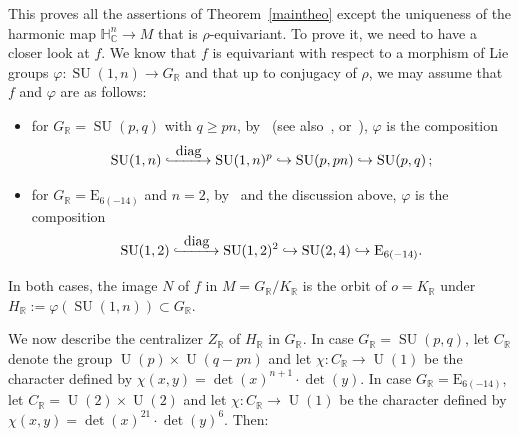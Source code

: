 \documentclass[10pt]{amsart}
\newcommand{\hto}{\mathrel{\lhook\joinrel\to}}
\newcommand{\To}[1]{\mathchoice{\xrightarrow{\textstyle\kern4pt#1\kern3pt}}{\stackrel{#1}{\longrightarrow}}{}{}}
\newcommand{\Hto}[1]{\mathrel{\lhook\joinrel\To{#1}}}
\newcommand{\citestar}[3]{\cite[#3]{#1}}
\theoremstyle{plain}
\theoremstyle{definition}
\DeclareMathOperator{\diag}{diag}
\DeclareMathOperator{\SU}{SU}
\DeclareMathOperator{\rU}{U}
\newcommand{\bR}{\mathbb{R}}
\newcommand{\HC}{{\mathbb{H}^n_\mathbb{C}}}
\begin{document}
This proves all the assertions of Theorem~\ref{maintheo}
except the uniqueness of the harmonic map $\HC\to M$ that is
$\rho$-equivariant. To prove
it, we need to have a closer look at $f$. We know that
$f$ is equivariant with respect to a morphism of
Lie groups $\varphi: \SU(1,n) \to G_\bR$ and that up to conjugacy of $\rho$, we may assume that $f$
and $\varphi$ are as follows:
\begin{itemize}
\item for $G_\bR=\SU(p,q)$ with $q\geq pn$, by~\citestar{KMrank2}*{} (see
also~\citestar{KM}*{Prop.\,4.10}, or~\cite{Hamlet}), $\varphi$ is the composition
$$
\SU(1,n)\Hto{\diag}
\SU(1,n)^p
\hto\SU(p,pn)\hto
\SU(p,q)\,;
$$

\item for $G_\bR=\mathrm{E}_{6(-14)}$ and $n=2$, by~\cite{Hamlet} and the discussion above,
$\varphi$ is the composition
$$
\SU(1,2) \Hto{\diag}
\SU(1,2)^2
\hto\SU(2,4)\hto \mathrm{E}_{6(-14)}.
$$
\end{itemize}

In both cases, the image $N$ of $f$ in $M=G_\bR/K_\bR$ is the orbit of $o=K_\bR$ under
$H_\bR:=\varphi(\SU(1,n))\subset G_\bR$.

We now describe the centralizer $Z_\bR$ of $H_\bR$ in $G_\bR$.
In case $G_\bR = \SU(p,q)$, let $C_\bR$ denote the group $\rU(p) \times \rU(q-pn)$ and let
$\chi: C_\bR \to \rU(1)$ be the character defined by $\chi(x,y)=\det(x)^{n+1} \cdot \det(y)$.
In case $G_\bR = \mathrm{E}_{6(-14)}$, let $C_\bR = \rU(2) \times \rU(2)$ and let $\chi: C_\bR \to \rU(1)$
be the character defined by $\chi(x,y)=\det(x)^{21} \cdot \det(y)^6$. Then:
\end{document}
